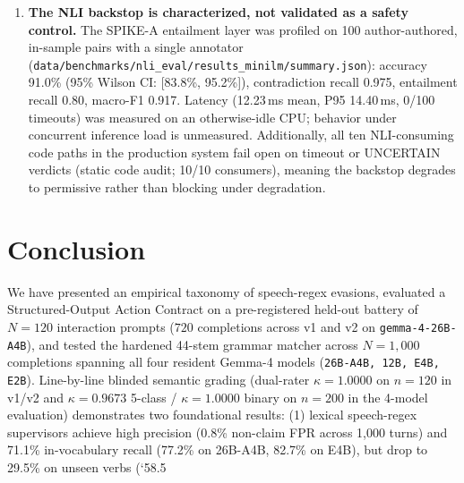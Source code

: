 \documentclass[11pt,a4paper]{article}
\begin{document}
\begin{enumerate}
    \item \textbf{The NLI backstop is characterized, not validated as a safety control.} The SPIKE-A entailment layer was profiled on 100 author-authored, in-sample pairs with a single annotator (\texttt{data/benchmarks/nli\_eval/results\_minilm/summary.json}): accuracy 91.0\% (95\% Wilson CI: [83.8\%, 95.2\%]), contradiction recall 0.975, entailment recall 0.80, macro-F1 0.917. Latency (12.23\,ms mean, P95 14.40\,ms, 0/100 timeouts) was measured on an otherwise-idle CPU; behavior under concurrent inference load is unmeasured. Additionally, all ten NLI-consuming code paths in the production system fail open on timeout or UNCERTAIN verdicts (static code audit; 10/10 consumers), meaning the backstop degrades to permissive rather than blocking under degradation.
\end{enumerate}

\section{Conclusion}
\label{sec:conclusion}
We have presented an empirical taxonomy of speech-regex evasions, evaluated a Structured-Output Action Contract on a pre-registered held-out battery of $N=120$ interaction prompts ($720$ completions across v1 and v2 on \texttt{gemma-4-26B-A4B}), and tested the hardened 44-stem grammar matcher across $N=1{,}000$ completions spanning all four resident Gemma-4 models (\texttt{26B-A4B, 12B, E4B, E2B}). Line-by-line blinded semantic grading (dual-rater $\kappa = 1.0000$ on $n=120$ in v1/v2 and $\kappa = 0.9673$ 5-class / $\kappa = 1.0000$ binary on $n=200$ in the 4-model evaluation) demonstrates two foundational results: (1) lexical speech-regex supervisors achieve high precision (0.8\% non-claim FPR across 1,000 turns) and 71.1\% in-vocabulary recall (77.2\% on 26B-A4B, 82.7\% on E4B), but drop to 29.5\% on unseen verbs (`58.5%
\end{document}
